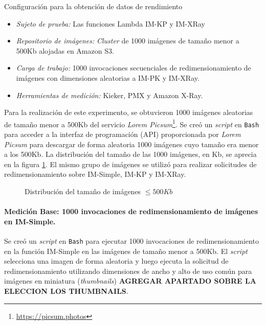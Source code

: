 Configuración para la obtención de datos de rendimiento

\begin{itemize}
    \item \emph{Sujeto de prueba:} Las funciones Lambda IM-KP y IM-XRay
    \item \emph{Repositorio de imágenes:} \emph{Cluster} de 1000 imágenes de tamaño menor a 500Kb alojadas en Amazon S3.     
    \item \emph{Carga de trabajo:} 1000 invocaciones secuenciales de redimensionamiento de imágenes con dimensiones aleatorias a IM-PK y IM-XRay.
    \item \emph{Herramientas de medición:} Kieker, PMX y Amazon X-Ray.
\end{itemize}

Para la realización de este experimento, se obtuvieron 1000 imágenes aleatorias de tamaño menor a 500Kb del servicio \emph{Lorem Picsum}\footnote{\url{https://picsum.photos}}. Se creó un \emph{script} en \texttt{Bash} para acceder a la interfaz de programación (API) proporcionada por \emph{Lorem Picsum} para descargar de forma aleatoria 1000 imágenes cuyo tamaño era menor a los 500Kb. La distribución del tamaño de las 1000 imágenes, en Kb, se aprecia en la figura \ref{fig:distribucion-tamanno-imagenes-hasta-500kb}. El mismo grupo de imágenes se utilizó para realizar solicitudes de redimensionamiento sobre IM-Simple, IM-KP y IM-XRay.

\begin{figure}
\hspace{-1cm}
\caption{Distribución del tamaño de imágenes $\leq 500Kb$}
\label{fig:distribucion-tamanno-imagenes-hasta-500kb}
\end{figure}

\paragraph{Medición Base: 1000 invocaciones de redimensionamiento de imágenes en IM-Simple.} 
Se creó un \emph{script} en \texttt{Bash} para ejecutar 1000 invocaciones de redimensionamiento en la función IM-Simple en las imágenes de tamaño menor a 500Kb. El \emph{script} selecciona una imagen de forma aleatoria y luego ejecuta la solicitud de redimensionamiento utilizando dimensiones de ancho y alto de uso común para imágenes en miniatura (\emph{thumbnails}) \textbf{AGREGAR APARTADO SOBRE LA ELECCION LOS THUMBNAILS}.

